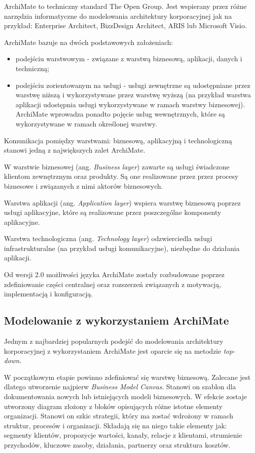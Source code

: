 ArchiMate to techniczny standard The Open Group. Jest wspierany przez różne narzędzia informatyczne do modelowania architektury korporacyjnej jak na przykład: Enterprise Architect, BizzDesign Architect, ARIS lub Microsoft Visio. \cite{OpenGrArch} 

ArchiMate bazuje na dwóch podstawowych założeniach:
\begin{itemize}
\item{podejściu warstwowym - związane z warstwą biznesową, aplikacji, danych i techniczną;}
\item{podejściu zorientowanym na usługi - usługi zewnętrzne są udostępniane przez warstwę niższą i wykorzystywane przez warstwę wyższą (na przykład warstwa aplikacji udostępnia usługi wykorzystywane w ramach warstwy biznesowej). ArchiMate wprowadza ponadto pojęcie usług wewnętrznych, które są wykorzystywane w ramach określonej warstwy.}
\end{itemize}

Komunikacja pomiędzy warstwami: biznesową, aplikacyjną i technologiczną stanowi jedną z największych zalet ArchiMate.

W warstwie biznesowej (ang. \emph{Business layer}) zawarte są usługi świadczone klientom zewnętrznym oraz produkty. Są one realizowane przez przez procesy biznesowe i związanych z nimi aktorów biznesowych.

Warstwa aplikacji (ang. \emph{Application layer}) wspiera warstwę biznesową poprzez usługi aplikacyjne, które są realizowane przez poszczególne komponenty aplikacyjne.

Warstwa technologiczna (ang. \emph{Technology layer}) odzwierciedla usługi infrastrukturalne (na przykład usługi komunikacyjne), niezbędne do działania aplikacji.

Od wersji 2.0 możliwości języka ArchiMate zostały rozbudowane poprzez zdefiniowanie części centralnej oraz rozszerzeń związanych z motywacją, implementacją i konfiguracją. \cite{ArchKorpSob}


\subsection{Modelowanie z wykorzystaniem ArchiMate}
Jednym z najbardziej popularnych podejść do modelowania architektury korporacyjnej z wykorzystaniem ArchiMate jest oparcie się na metodzie \emph{top-down}. 

W początkowym etapie powinno zdefiniować się warstwę biznesową. Zalecane jest dlatego utworzenie najpierw \emph{Business Model Canvas}. Stanowi on szablon dla dokumentowania nowych lub istniejących modeli biznesowych. W efekcie zostaje utworzony diagram złożony z bloków opisujących różne istotne elementy organizacji. Stanowi on szkic strategii, który ma zostać wdrożony w ramach struktur, procesów i organizacji. Składają się na niego takie elementy jak: segmenty klientów, propozycje wartości, kanały, relacje z klientami, strumienie przychodów, kluczowe zasoby, działania, partnerzy oraz struktura kosztów. 

